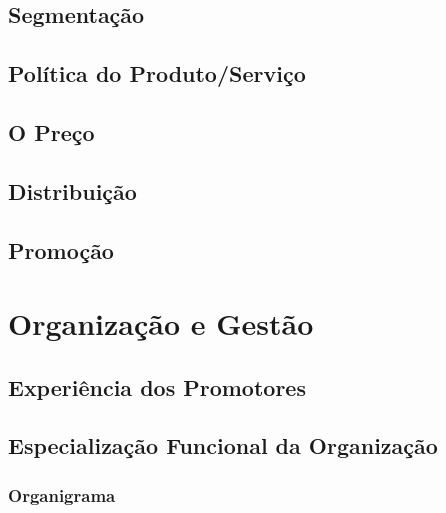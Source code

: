\documentclass[11pt]{article}
\begin{document}
	\normalsize
	
	
	\large
	\subsection{Segmentação}
	
	\normalsize
	
	
	\large
	\subsection{Política do Produto/Serviço}
	
	\normalsize
	
	
	\large
	\subsection{O Preço}
	
	\normalsize
	
	
	\large
	\subsection{Distribuição}
	
	\normalsize
	
	
	\large
	\subsection{Promoção}
	
	\normalsize
	
	\pagebreak
	
	\large
	\section{Organização e Gestão}
	
	\normalsize
	
	
	\large
	\subsection{Experiência dos Promotores}
	
	\normalsize
	
	
	\large
	\subsection{Especialização Funcional da Organização}
	
	\normalsize
	
	
	\large
	\subsubsection{Organigrama}
	
\end{document}
